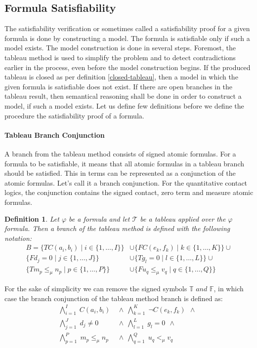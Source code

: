 \documentclass{article}
\newtheorem{defn}{Definition}[section]
\newcommand{\signT}{\mathbb{T}}
\newcommand{\signF}{\mathbb{F}}
\newcommand{\BranchConjunction}{%
\begin{align*}
			\bigwedge_{i=1}^{I} \; C(a_i, b_i) \:\: & \wedge \:\: 
			\bigwedge_{k=1}^{K} \; \neg C(e_k, f_k) \:\: \wedge \:\: \\
			\bigwedge_{j=1}^{J} \; d_j \neq 0 \:\: & \wedge \:\:
			\bigwedge_{l=1}^{L} \; g_l = 0 \:\: \wedge \:\:\\
			\bigwedge_{p=1}^{P} \; m_p \le_\mu n_p \:\: &\wedge \:\:
			\bigwedge_{q=1}^{Q} \; u_q <_\mu v_q \:\:
\end{align*}%
}
\begin{document}
	\subsection{Formula Satisfiability} 
The satisfiability verification or sometimes called a satisfiability proof for a given formula is done by constructing a model. The formula is satisfiable only if such a model exists. The model construction is done in several steps. Foremost, the tableau method is used to simplify the problem and to detect contradictions earlier in the process, even before the model construction begins. If the produced tableau is closed as per definition \ref{closed-tableau}, then a model in which the given formula is satisfiable does not exist. If there are open branches in the tableau result, then semantical reasoning shall be done in order to construct a model, if such a model exists. Let us define few definitions before we define the procedure the satisfiability proof of a formula.

	\paragraph{Tableau Branch Conjunction}
		A branch from the tableau method consists of signed atomic formulas. For a formula to be satisfiable, it means that all atomic formulas in a tableau branch should be satisfied. This in terms can be represented as a conjunction of the atomic formulas. Let's call it a branch conjunction. For the quantitative contact logics, the conjunction contains the signed contact, zero term and measure atomic formulas.
	\begin{defn}
		Let $\varphi$ be a formula and let $\mathcal{T}$ be a tableau applied over the $\varphi$ formula. Then a branch of the tableau method is defined with the following notation:
		\begin{align*}
				B = \{T C(a_i, b_i) \mid i \in \{1, \ldots, I\} \} &\cup 
					\{F C(e_k, f_k) \mid k \in \{1, \ldots, K\} \} \cup \\
					\{F d_j = 0 \mid j \in \{1, \ldots, J\} \} &\cup 
					\{T g_l = 0 \mid l \in \{1, \ldots, L\} \} \cup \\
					\{T m_p \le_\mu n_p \mid p \in \{1, \ldots, P\} \} &\cup 
					\{F u_q \le_\mu v_q \mid q \in \{1, \ldots, Q\} \}
		\end{align*}
	\end{defn}
	For the sake of simplicity we can remove the signed symbols $\signT \textit{ and } \signF$, in which case the branch conjunction of the tableau method branch is defined as:
	\BranchConjunction
\end{document}
